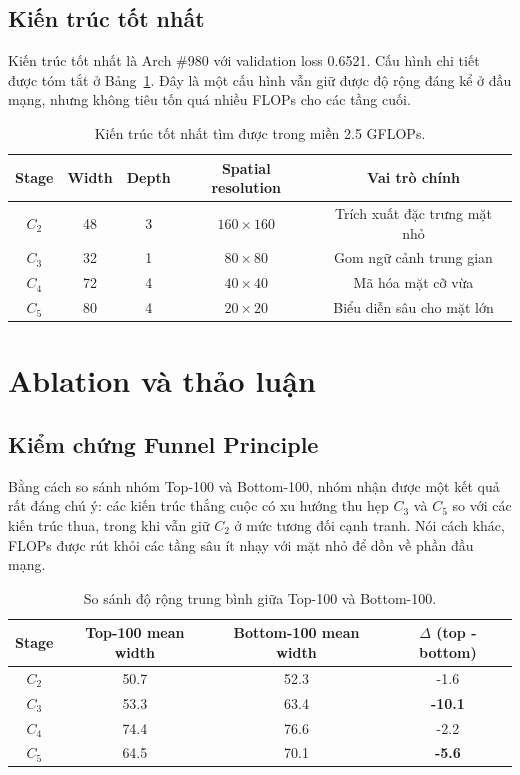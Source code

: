 \section{Kiến trúc tốt nhất}

Kiến trúc tốt nhất là Arch \#980 với validation loss 0.6521. Cấu hình chi tiết được tóm tắt ở Bảng~\ref{tab:best-arch}. Đây là một cấu hình vẫn giữ được độ rộng đáng kể ở đầu mạng, nhưng không tiêu tốn quá nhiều FLOPs cho các tầng cuối.

\begin{table}[H]
\centering
\caption{Kiến trúc tốt nhất tìm được trong miền 2.5 GFLOPs.}
\label{tab:best-arch}
\begin{tabular}{@{}ccccc@{}}
\toprule
\textbf{Stage} & \textbf{Width} & \textbf{Depth} & \textbf{Spatial resolution} & \textbf{Vai trò chính} \\
\midrule
\(C_2\) & 48 & 3 & \(160 \times 160\) & Trích xuất đặc trưng mặt nhỏ \\
\(C_3\) & 32 & 1 & \(80 \times 80\) & Gom ngữ cảnh trung gian \\
\(C_4\) & 72 & 4 & \(40 \times 40\) & Mã hóa mặt cỡ vừa \\
\(C_5\) & 80 & 4 & \(20 \times 20\) & Biểu diễn sâu cho mặt lớn \\
\bottomrule
\end{tabular}
\end{table}

\chapter{Ablation và thảo luận}

\section{Kiểm chứng Funnel Principle}

Bằng cách so sánh nhóm Top-100 và Bottom-100, nhóm nhận được một kết quả rất đáng chú ý: các kiến trúc thắng cuộc có xu hướng thu hẹp \(C_3\) và \(C_5\) so với các kiến trúc thua, trong khi vẫn giữ \(C_2\) ở mức tương đối cạnh tranh. Nói cách khác, FLOPs được rút khỏi các tầng sâu ít nhạy với mặt nhỏ để dồn về phần đầu mạng.

\begin{table}[H]
\centering
\caption{So sánh độ rộng trung bình giữa Top-100 và Bottom-100.}
\begin{tabular}{@{}cccc@{}}
\toprule
\textbf{Stage} & \textbf{Top-100 mean width} & \textbf{Bottom-100 mean width} & \textbf{\(\Delta\) (top - bottom)} \\
\midrule
\(C_2\) & 50.7 & 52.3 & -1.6 \\
\(C_3\) & 53.3 & 63.4 & \textbf{-10.1} \\
\(C_4\) & 74.4 & 76.6 & -2.2 \\
\(C_5\) & 64.5 & 70.1 & \textbf{-5.6} \\
\bottomrule
\end{tabular}
\end{table}

